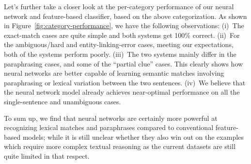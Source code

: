 

Let's further take a closer look at the per-category performance of our neural network and feature-based classifier, based on the above categorization. As shown in Figure~\ref{fig:category-performance}, we have the following observations: (i)~The exact-match cases are quite simple and both systems get 100\% correct. (ii)~For the ambiguous\slash hard and entity-linking-error cases, meeting our expectations, both of the systems perform poorly. (iii)~The two systems mainly differ in the paraphrasing cases, and some of the ``partial clue'' cases. This clearly shows how neural networks are better capable of learning semantic matches involving paraphrasing or lexical variation between the two sentences. (iv)~We believe that the neural network model already achieves near-optimal performance on all the single-sentence and unambiguous cases.

To sum up, we find that neural networks are certainly more powerful at recognizing lexical matches and paraphrases compared to conventional feature-based models; while it is still unclear whether they also win out on the examples which require more complex textual reasoning as the current datasets are still quite limited in that respect.
